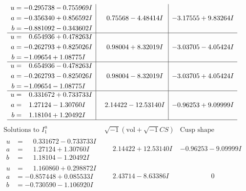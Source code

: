 \documentclass[1p]{elsarticle_modified}
\theoremstyle{definition}
\newcommand{\I}{\sqrt{-1}}
\begin{document}
$$\begin{array}{c|c|c}
\begin{aligned}
u &= -0.295738 - 0.755969 I \\
a &= -0.356340 + 0.856592 I \\
b &= -0.881092 - 0.343602 I\end{aligned}
 & \phantom{-}0.75568 - 4.48414 I & -3.17555 + 9.83264 I \\ \hline\begin{aligned}
u &= \phantom{-}0.654936 + 0.478263 I \\
a &= -0.262793 + 0.825026 I \\
b &= -1.09654 + 1.08775 I\end{aligned}
 & \phantom{-}0.98004 + 8.32019 I & -3.03705 - 4.05424 I \\ \hline\begin{aligned}
u &= \phantom{-}0.654936 - 0.478263 I \\
a &= -0.262793 - 0.825026 I \\
b &= -1.09654 - 1.08775 I\end{aligned}
 & \phantom{-}0.98004 - 8.32019 I & -3.03705 + 4.05424 I \\ \hline\begin{aligned}
u &= \phantom{-}0.331672 + 0.733733 I \\
a &= \phantom{-}1.27124 - 1.30760 I \\
b &= \phantom{-}1.18104 + 1.20492 I\end{aligned}
 & \phantom{-}2.14422 - 12.53140 I & -0.96253 + 9.09999 I\\
 \hline 
 \end{array}$$\newpage$$\begin{array}{c|c|c}  
\text{Solutions to }I^u_{1}& \I (\text{vol} + \sqrt{-1}CS) & \text{Cusp shape}\\
 \hline 
\begin{aligned}
u &= \phantom{-}0.331672 - 0.733733 I \\
a &= \phantom{-}1.27124 + 1.30760 I \\
b &= \phantom{-}1.18104 - 1.20492 I\end{aligned}
 & \phantom{-}2.14422 + 12.53140 I & -0.96253 - 9.09999 I \\ \hline\begin{aligned}
u &= \phantom{-}1.160860 + 0.298872 I \\
a &= -0.857448 + 0.085533 I \\
b &= -0.730590 - 1.106920 I\end{aligned}
 & \phantom{-}2.43714 - 8.63386 I & \phantom{-0.000000 } 0 \\ \hline\begin{aligned}

\end{aligned}
\end{array}$$
\end{document}
